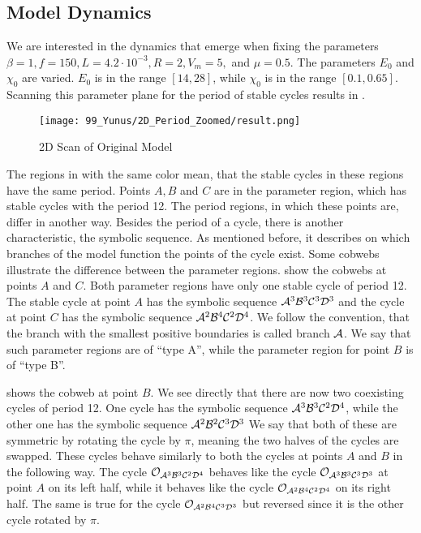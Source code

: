 \subsection{Model Dynamics}
\label{sec:og.dynamics}
\label{sec:state.og.dynamics}

We are interested in the dynamics that emerge when fixing the parameters $\beta = 1, f = 150, L = 4.2 \cdot 10^{-3}, R = 2, V_m = 5,$ and $\mu = 0.5$.
The parameters $E_0$ and $\chi_0$ are varied.
$E_0$ is in the range $[14, 28]$, while $\chi_0$ is in the range $[0.1, 0.65]$.
Scanning this parameter plane for the period of stable cycles results in .

\begin{figure}
	\centering
	\texttt{[image: 99\_Yunus/2D\_Period\_Zoomed/result.png]}
	\caption{2D Scan of Original Model}
	\label{fig:yunus.2pi.2d.full}
\end{figure}

The regions in  with the same color mean, that the stable cycles in these regions have the same period.
Points $A, B$ and $C$ are in the parameter region, which has stable cycles with the period 12.
The period regions, in which these points are, differ in another way.
Besides the period of a cycle, there is another characteristic, the symbolic sequence.
As mentioned before, it describes on which branches of the model function the points of the cycle exist.
Some cobwebs illustrate the difference between the parameter regions.
 show the cobwebs at points $A$ and $C$.
Both parameter regions have only one stable cycle of period 12.
The stable cycle at point $A$ has the symbolic sequence $\mathcal{A}^3\mathcal{B}^3\mathcal{C}^3\mathcal{D}^3$ and the cycle at point $C$ has the symbolic sequence $\mathcal{A}^2\mathcal{B}^4\mathcal{C}^2\mathcal{D}^4$.
We follow the convention, that the branch with the smallest positive boundaries is called branch $\mathcal{A}$.
We say that such parameter regions are of ``type A'', while the parameter region for point $B$ is of ``type B''.

 shows the cobweb at point $B$.
We see directly that there are now two coexisting cycles of period 12.
One cycle has the symbolic sequence $\mathcal{A}^3\mathcal{B}^3\mathcal{C}^2\mathcal{D}^4$, while the other one has the symbolic sequence $\mathcal{A}^2\mathcal{B}^2\mathcal{C}^3\mathcal{D}^3$
We say that both of these are symmetric by rotating the cycle by $\pi$, meaning the two halves of the cycles are swapped.
These cycles behave similarly to both the cycles at points $A$ and $B$ in the following way.
The cycle $\mathcal{O}_{\mathcal{A}^3\mathcal{B}^3\mathcal{C}^2\mathcal{D}^4}$ behaves like the cycle $\mathcal{O}_{\mathcal{A}^3\mathcal{B}^3\mathcal{C}^3\mathcal{D}^3}$ at point $A$ on its left half, while it behaves like the cycle $\mathcal{O}_{\mathcal{A}^2\mathcal{B}^4\mathcal{C}^2\mathcal{D}^4}$ on its right half.
The same is true for the cycle $\mathcal{O}_{\mathcal{A}^2\mathcal{B}^4\mathcal{C}^3\mathcal{D}^3}$ but reversed since it is the other cycle rotated by $\pi$.

